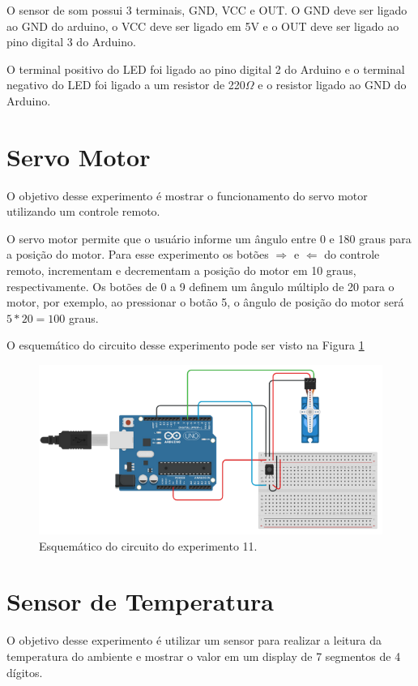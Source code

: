 \documentclass[12pt]{article}
\begin{document}
O sensor de som possui 3 terminais, GND, VCC e OUT. O GND deve ser ligado ao GND do arduino, o VCC deve ser ligado em 5V e o OUT deve ser ligado ao pino digital 3 do Arduino.

O terminal positivo do LED foi ligado ao pino digital 2 do Arduino e o terminal negativo do LED foi ligado a um resistor de 220$\Omega$ e o resistor ligado ao GND do Arduino.

\section{Servo Motor}
O objetivo desse experimento é mostrar o funcionamento do servo motor utilizando um controle remoto.

O servo motor permite que o usuário informe um ângulo entre 0 e 180 graus para a posição do motor. Para esse experimento os botões $\Rightarrow$ e $\Leftarrow$ do controle remoto, incrementam e decrementam a posição do motor em 10 graus, respectivamente. Os botões de 0 a 9 definem um ângulo múltiplo de 20 para o motor, por exemplo, ao pressionar o botão 5, o ângulo de posição do motor será $5*20 = 100$ graus.

O esquemático do circuito desse experimento pode ser visto na Figura \ref{figExp11esq}

\begin{figure}[H]
	\centering
	\includegraphics[scale=0.5]{Imagens/Experimentos/11-ServoMotor/esq.png}
	\caption{Esquemático do circuito do experimento 11.}
	\label{figExp11esq}
\end{figure}

\section{Sensor de Temperatura}
O objetivo desse experimento é utilizar um sensor para realizar a leitura da temperatura do ambiente e mostrar o valor em um display de 7 segmentos de 4 dígitos.
\end{document}
